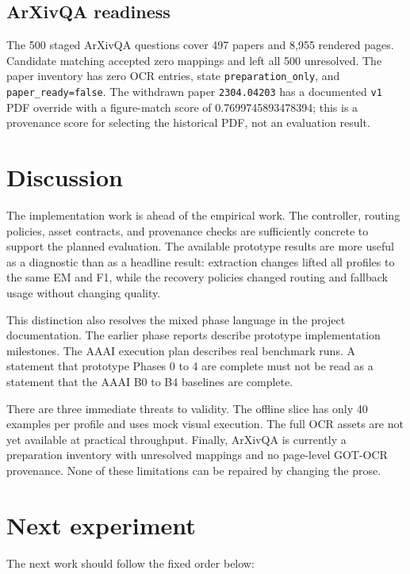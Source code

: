 \documentclass[10pt,twocolumn]{article}
\begin{document}
\subsection{ArXivQA readiness}

The 500 staged ArXivQA questions cover 497 papers and 8,955 rendered pages. Candidate matching accepted zero mappings and left all 500 unresolved. The paper inventory has zero OCR entries, state \texttt{preparation\_only}, and \texttt{paper\_ready=false}. The withdrawn paper \texttt{2304.04203} has a documented \texttt{v1} PDF override with a figure-match score of 0.7699745893478394; this is a provenance score for selecting the historical PDF, not an evaluation result.

\section{Discussion}

The implementation work is ahead of the empirical work. The controller, routing policies, asset contracts, and provenance checks are sufficiently concrete to support the planned evaluation. The available prototype results are more useful as a diagnostic than as a headline result: extraction changes lifted all profiles to the same EM and F1, while the recovery policies changed routing and fallback usage without changing quality.

This distinction also resolves the mixed phase language in the project documentation. The earlier phase reports describe prototype implementation milestones. The AAAI execution plan describes real benchmark runs. A statement that prototype Phases 0 to 4 are complete must not be read as a statement that the AAAI B0 to B4 baselines are complete.

There are three immediate threats to validity. The offline slice has only 40 examples per profile and uses mock visual execution. The full OCR assets are not yet available at practical throughput. Finally, ArXivQA is currently a preparation inventory with unresolved mappings and no page-level GOT-OCR provenance. None of these limitations can be repaired by changing the prose.

\section{Next experiment}

The next work should follow the fixed order below:
\end{document}
